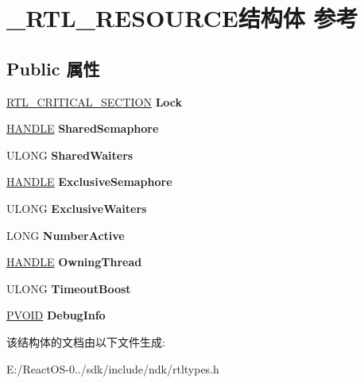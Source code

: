 \hypertarget{struct___r_t_l___r_e_s_o_u_r_c_e}{}\section{\+\_\+\+R\+T\+L\+\_\+\+R\+E\+S\+O\+U\+R\+C\+E结构体 参考}
\label{struct___r_t_l___r_e_s_o_u_r_c_e}
\subsection*{Public 属性}
\begin{DoxyCompactItemize}
\item 
\mbox{\label{struct___r_t_l___r_e_s_o_u_r_c_e_af04de06868e13a641a862e331d5cfc0d}} 
\hyperlink{struct___r_t_l___c_r_i_t_i_c_a_l___s_e_c_t_i_o_n}{R\+T\+L\+\_\+\+C\+R\+I\+T\+I\+C\+A\+L\+\_\+\+S\+E\+C\+T\+I\+ON} {\bfseries Lock}
\item 
\mbox{\label{struct___r_t_l___r_e_s_o_u_r_c_e_a1e075f9a8cab654104f0cce35c01b32d}} 
\hyperlink{interfacevoid}{H\+A\+N\+D\+LE} {\bfseries Shared\+Semaphore}
\item 
\mbox{\label{struct___r_t_l___r_e_s_o_u_r_c_e_aac8bba7422d8089dc457ab8ff7943bd4}} 
U\+L\+O\+NG {\bfseries Shared\+Waiters}
\item 
\mbox{\label{struct___r_t_l___r_e_s_o_u_r_c_e_ae0b894adeeb27dcf097a20904c50cbba}} 
\hyperlink{interfacevoid}{H\+A\+N\+D\+LE} {\bfseries Exclusive\+Semaphore}
\item 
\mbox{\label{struct___r_t_l___r_e_s_o_u_r_c_e_a2dd8cc885493cc036e798002e66db501}} 
U\+L\+O\+NG {\bfseries Exclusive\+Waiters}
\item 
\mbox{\label{struct___r_t_l___r_e_s_o_u_r_c_e_a1a853d61b1604873755b2576612f0111}} 
L\+O\+NG {\bfseries Number\+Active}
\item 
\mbox{\label{struct___r_t_l___r_e_s_o_u_r_c_e_a8fad6dea07963d3e907828c756ff0900}} 
\hyperlink{interfacevoid}{H\+A\+N\+D\+LE} {\bfseries Owning\+Thread}
\item 
\mbox{\label{struct___r_t_l___r_e_s_o_u_r_c_e_a9d6586389243b144fb586bb27c0acd7d}} 
U\+L\+O\+NG {\bfseries Timeout\+Boost}
\item 
\mbox{\label{struct___r_t_l___r_e_s_o_u_r_c_e_a58e70da8f5ffb225a6cdd972f8b3a495}} 
\hyperlink{interfacevoid}{P\+V\+O\+ID} {\bfseries Debug\+Info}
\end{DoxyCompactItemize}


该结构体的文档由以下文件生成\+:\begin{DoxyCompactItemize}
\item 
E\+:/\+React\+O\+S-\/0../sdk/include/ndk/rtltypes.\+h\end{DoxyCompactItemize}
